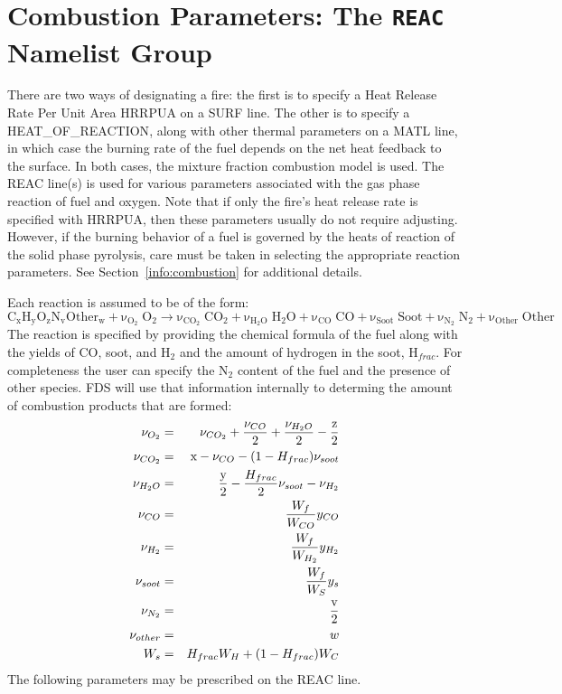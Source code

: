 \documentclass[11pt]{book}
\newcommand{\be}{\begin{equation}}
\newcommand{\ee}{\end{equation}}
\begin{document}
\clearpage
\section{Combustion Parameters: The \texorpdfstring{{\tt REAC}}{REAC} Namelist Group}
\label{info:REAC}

There are two ways of designating a fire: the first is to specify a
Heat Release Rate Per Unit Area {\ct HRRPUA} on a
{\ct SURF} line. The other is to specify a
{\ct HEAT\_OF\_REACTION}, along with other thermal parameters on a {\ct MATL} line,
in which case the burning rate of the fuel depends on the net heat feedback to the surface.
In both cases, the mixture fraction combustion model is used.
The {\ct REAC} line(s) is used for various parameters associated with the gas phase
reaction of fuel and oxygen. Note that if only the fire's heat release
rate is specified with {\ct HRRPUA}, then these parameters usually do not
require adjusting. However, if the burning behavior of a fuel
is governed by the heats of reaction of the solid phase pyrolysis,
care must be taken in selecting the appropriate reaction parameters.
See Section~\ref{info:combustion} for additional details.

Each reaction is assumed to be of the form:
\be \mathrm{C_xH_yO_zN_vOther_w + \nu_{O_2} \; O_2 \rightarrow
    \nu_{CO_2} \; CO_2 + \nu_{H_2O} \; H_2O +
    \nu_{CO}   \; CO   + \nu_{Soot} \; Soot + \nu_{N_2} \; N_2 + \nu_{Other} \; Other } \ee
The reaction is specified by providing the chemical formula of the fuel along with
the yields of CO, soot, and H$_2$ and the amount of hydrogen in the soot, H$_{frac}$.
For completeness the user can specify the N$_2$ content of
the fuel and the presence of other species. FDS will use that information internally to
determing the amount of combustion products that are formed:
\begin{eqnarray*}
\nu_{O_2} &=& \nu_{CO_2} + \frac{\nu_{CO}}{2} + \frac{\nu_{H_2O}}{2} - \frac{\hbox{z}}{2} \\
\nu_{CO_2} &=& \hbox{x} - \nu_{CO} - (1-H_{frac}) \nu_{soot}  \\
\nu_{H_2O} &=& \frac{\hbox{y}}{2} - \frac{H_{frac}}{2} \nu_{soot} - \nu_{H_2} \\
\nu_{CO}   &=& \frac{W_f}{W_{CO}} y_{CO} \\
\nu_{H_2}  &=& \frac{W_f}{W_{H_2}} y_{H_2} \\
\nu_{soot} &=& \frac{W_f}{W_S} y_s \\
\nu_{N_2} &=& \frac{\hbox{v}}{2} \\
\nu_{other} &=& w\\
W_s &=& H_{frac} W_H + (1-H_{frac}) W_C
\end{eqnarray*}
The following parameters may be prescribed on the {\ct REAC} line.
\end{document}
